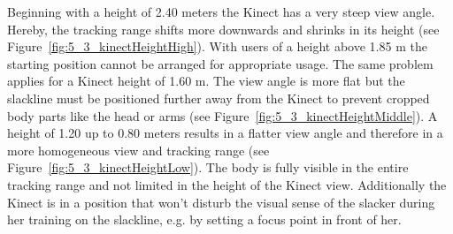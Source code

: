Beginning with a height of 2.40 meters the Kinect has a very steep view angle.
Hereby, the tracking range shifts more downwards and shrinks in its height (see Figure~\ref{fig:5_3_kinectHeightHigh}).
With users of a height above 1.85 m the starting position cannot be arranged for appropriate usage.
The same problem applies for a Kinect height of 1.60 m. The view angle is more flat but the slackline must be positioned further away from the Kinect to prevent cropped body parts like the head or arms (see Figure~\ref{fig:5_3_kinectHeightMiddle}).
A height of 1.20 up to 0.80 meters results in a flatter view angle and therefore in a more homogeneous view and tracking range (see Figure~\ref{fig:5_3_kinectHeightLow}).
The body is fully visible in the entire tracking range and not limited in the height of the Kinect view.
Additionally the Kinect is in a position that won't disturb the visual sense of the slacker during her training on the slackline, e.g. by setting a focus point in front of her.

